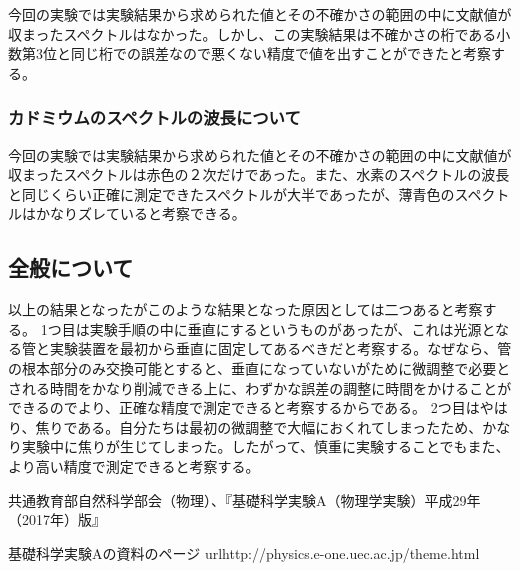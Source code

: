 \documentclass{jsarticle}
\begin{document}
今回の実験では実験結果から求められた値とその不確かさの範囲の中に文献値が収まったスペクトルはなかった。しかし、この実験結果は不確かさの桁である小数第3位と同じ桁での誤差なので悪くない精度で値を出すことができたと考察する。

\subsubsection{カドミウムのスペクトルの波長について}

今回の実験では実験結果から求められた値とその不確かさの範囲の中に文献値が収まったスペクトルは赤色の２次だけであった。また、水素のスペクトルの波長と同じくらい正確に測定できたスペクトルが大半であったが、薄青色のスペクトルはかなりズレていると考察できる。

\subsection{全般について}
以上の結果となったがこのような結果となった原因としては二つあると考察する。
1つ目は実験手順の中に垂直にするというものがあったが、これは光源となる管と実験装置を最初から垂直に固定してあるべきだと考察する。なぜなら、管の根本部分のみ交換可能とすると、垂直になっていないがために微調整で必要とされる時間をかなり削減できる上に、わずかな誤差の調整に時間をかけることができるのでより、正確な精度で測定できると考察するからである。
2つ目はやはり、焦りである。自分たちは最初の微調整で大幅におくれてしまったため、かなり実験中に焦りが生じてしまった。したがって、慎重に実験することでもまた、より高い精度で測定できると考察する。

\begin{thebibliography}{99}
     共通教育部自然科学部会（物理）、『基礎科学実験A（物理学実験）平成29年（2017年）版』
\end{thebibliography}

基礎科学実験Aの資料のページ
url{http://physics.e-one.uec.ac.jp/theme.html}
\end{document}
